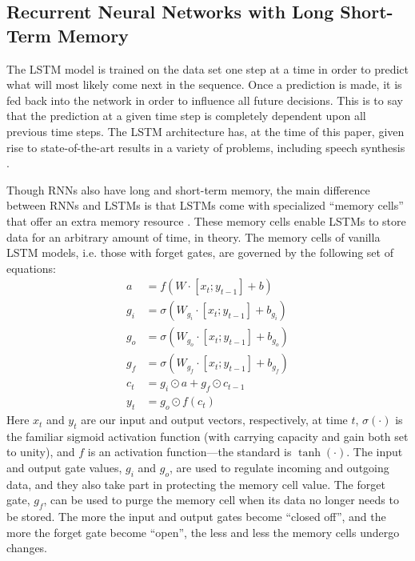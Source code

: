 \documentclass[conference]{IEEEtran}
\begin{document}
\subsection{Recurrent Neural Networks with Long Short-Term Memory}
The LSTM model is trained on the data set one step at a time in order to predict what will most
likely come next in the sequence. Once a prediction is made, it is fed back into the network in
order to influence all future decisions. This is to say that the prediction at a given time step
is completely dependent upon all previous time steps. The LSTM architecture has, at the time of
this paper, given rise to state-of-the-art results in a variety of problems, including speech
synthesis \cite{b13}.
\par
Though RNNs also have long and short-term memory, the main difference between RNNs and LSTMs is
that LSTMs come with specialized ``memory cells'' that offer an extra memory resource \cite{b16}.
These memory cells enable LSTMs to store data for an arbitrary amount of time, in theory. The memory
cells of vanilla LSTM models, i.e. those with forget gates, are governed by the following set of
equations:
\begin{align*}
a       &= f(W\cdot[x_t; y_{t-1}]+ b)                  \\
g_{i} &= \sigma(W_{g_i}\cdot[x_t; y_{t-1}]+ b_{g_i}) \\
g_{o} &= \sigma(W_{g_o}\cdot[x_t; y_{t-1}]+ b_{g_o}) \\
g_{f} &= \sigma(W_{g_f}\cdot[x_t; y_{t-1}]+ b_{g_f}) \\
c_t     &= g_{i}\odot a + g_{f}\odot c_{t-1}       \\
y_t     &= g_{o}\odot f(c_t)
\end{align*}
Here $x_t$ and $y_t$ are our input and output vectors, respectively, at time $t$, $\sigma(\cdot)$
is the familiar sigmoid activation function (with carrying capacity and gain both set to unity),
and $f$ is an activation function---the standard is $\tanh(\cdot)$. The input and output gate
values, $g_{i}$ and $g_{o}$, are used to regulate incoming and outgoing data, and they also 
take part in protecting the memory cell value. The forget gate, $g_{f}$, can be used to purge
the memory cell when its data no longer needs to be stored. The more the input and output gates
become ``closed off'', and the more the forget gate become ``open'', the less and less the memory
cells undergo changes.
\end{document}

